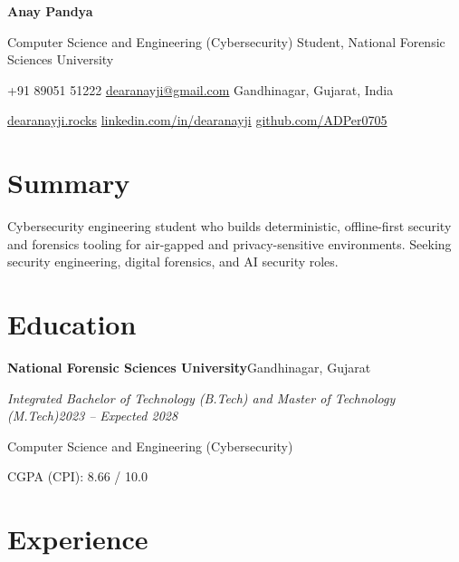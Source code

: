 \documentclass[10pt,a4paper]{article}
\newcommand{\cventry}[4]{%
  \vspace{6pt}%
  \needspace{5\baselineskip}%
  \textbf{#1}\hfill #2\par\nopagebreak[4]%
  \textit{#3}\hfill\textit{#4}\par\nopagebreak[4]%
  \vspace{1.5pt}\nopagebreak[4]%
}
\newcommand{\sep}{\enspace\textbar\enspace}
\begin{document}
\begin{center}
{\LARGE\bfseries Anay Pandya}\par\vspace{3pt}
Computer Science and Engineering (Cybersecurity) Student, National Forensic Sciences University\par\vspace{3pt}
+91 89051 51222\sep
\href{mailto:dearanayji@gmail.com}{dearanayji@gmail.com}\sep
Gandhinagar, Gujarat, India\par\vspace{1.5pt}
\href{https://dearanayji.rocks}{dearanayji.rocks}\sep
\href{https://linkedin.com/in/dearanayji}{linkedin.com/in/dearanayji}\sep
\href{https://github.com/ADPer0705}{github.com/ADPer0705}\par
\end{center}
\vspace{-4pt}

\section{Summary}
Cybersecurity engineering student who builds deterministic, offline-first security and forensics tooling for air-gapped and privacy-sensitive environments. Seeking security engineering, digital forensics, and AI security roles.

\section{Education}
\cventry{National Forensic Sciences University}{Gandhinagar, Gujarat}%
  {Integrated Bachelor of Technology (B.Tech) and Master of Technology (M.Tech)}{2023 -- Expected 2028}
Computer Science and Engineering (Cybersecurity)\par
CGPA (CPI): 8.66 / 10.0\par

\section{Experience}
\end{document}
